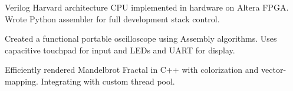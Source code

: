 \documentclass{cv}  %
\begin{document}
\begin{paracol}{2}
\parbox[t]{0.25 \textwidth}{\Large{}}
\hfill
\parbox[t]{0.5 \linewidth}{\vspace{-11pt} Verilog Harvard architecture CPU implemented in hardware on Altera FPGA. Wrote Python assembler for full development stack control.}
\hspace{0pt}
\vspace{-12pt}

\divider

\parbox[t]{0.25 \textwidth}{\Large{}}
\hfill
\parbox[t]{0.5 \linewidth}{\vspace{-11pt} Created a functional portable oscilloscope using Assembly algorithms. Uses capacitive touchpad for input and LEDs and UART for display.}
\hspace{0pt}
\vspace{-12pt}

\divider

\parbox[t]{0.25 \textwidth}{\Large{}}
\hfill
\parbox[t]{0.5 \linewidth}{\vspace{-11pt} Efficiently rendered Mandelbrot Fractal in C++ with colorization and vector-mapping. Integrating with custom thread pool.}
\hspace{0pt}
\vspace{-12pt}

\end{paracol}
\end{document}
